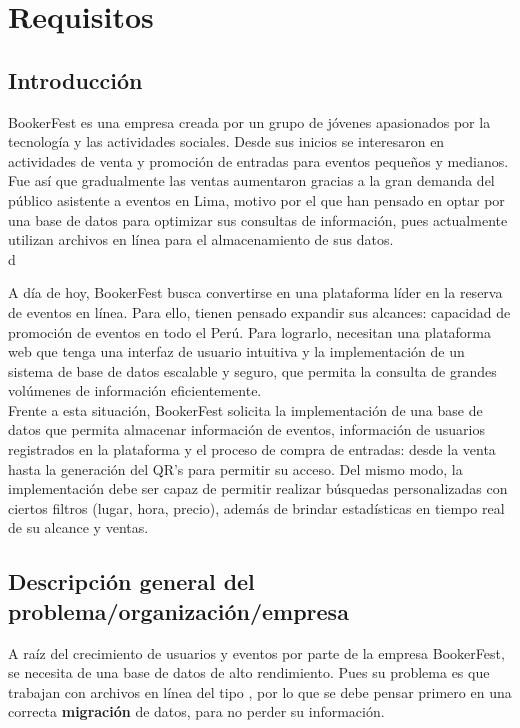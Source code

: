 \section{Requisitos}


\subsection{Introducción}
BookerFest es una empresa creada por un grupo de jóvenes apasionados por la tecnología y las actividades sociales. Desde sus inicios se interesaron en actividades de venta y promoción de entradas para eventos pequeños y medianos. Fue así que gradualmente las ventas aumentaron gracias a la gran demanda del público asistente a eventos en Lima, motivo por el que han pensado en optar por una base de datos para optimizar sus consultas de información, pues actualmente utilizan archivos  en línea para el almacenamiento de sus datos.\\ d

A día de hoy, BookerFest busca convertirse en una plataforma líder en la reserva de eventos en línea. Para ello, tienen pensado expandir sus alcances: capacidad de promoción de eventos en todo el Perú. Para lograrlo, necesitan una plataforma web que tenga una interfaz de usuario intuitiva y la implementación de un sistema de base de datos escalable y seguro, que permita la consulta de grandes volúmenes de información eficientemente.\\

Frente a esta situación, BookerFest solicita la implementación de una base de datos que permita almacenar información de eventos, información de usuarios registrados en la plataforma y el proceso de compra de entradas: desde la venta hasta la generación del QR's para permitir su acceso. Del mismo modo, la implementación debe ser capaz de permitir realizar búsquedas personalizadas con ciertos filtros (lugar, hora, precio), además de brindar estadísticas en tiempo real de su alcance y ventas.\\

\subsection{Descripción general del problema/organización/empresa}
A raíz del crecimiento de usuarios y eventos por parte de la empresa BookerFest, se necesita de una base de datos de alto rendimiento. Pues su problema es que trabajan con archivos en línea del tipo , por lo que se debe pensar primero en una correcta \textbf{migración} de datos, para no perder su información.\\

